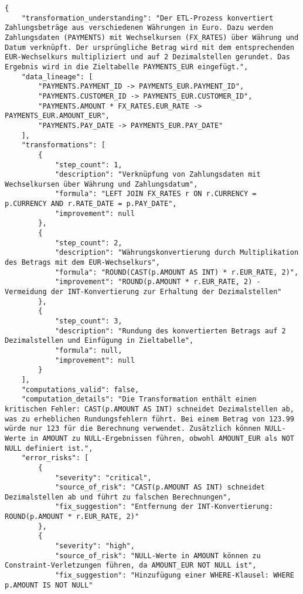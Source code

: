 \begin{lstlisting}[caption={Ausgabe: Claude Sonnet 4 Anwendungsfall 4 Robustheitsdurchlauf},label={claude_case4_prompt3}]
{
    "transformation_understanding": "Der ETL-Prozess konvertiert Zahlungsbeträge aus verschiedenen Währungen in Euro. Dazu werden Zahlungsdaten (PAYMENTS) mit Wechselkursen (FX_RATES) über Währung und Datum verknüpft. Der ursprüngliche Betrag wird mit dem entsprechenden EUR-Wechselkurs multipliziert und auf 2 Dezimalstellen gerundet. Das Ergebnis wird in die Zieltabelle PAYMENTS_EUR eingefügt.",
    "data_lineage": [
        "PAYMENTS.PAYMENT_ID -> PAYMENTS_EUR.PAYMENT_ID",
        "PAYMENTS.CUSTOMER_ID -> PAYMENTS_EUR.CUSTOMER_ID",
        "PAYMENTS.AMOUNT * FX_RATES.EUR_RATE -> PAYMENTS_EUR.AMOUNT_EUR",
        "PAYMENTS.PAY_DATE -> PAYMENTS_EUR.PAY_DATE"
    ],
    "transformations": [
        {
            "step_count": 1,
            "description": "Verknüpfung von Zahlungsdaten mit Wechselkursen über Währung und Zahlungsdatum",
            "formula": "LEFT JOIN FX_RATES r ON r.CURRENCY = p.CURRENCY AND r.RATE_DATE = p.PAY_DATE",
            "improvement": null
        },
        {
            "step_count": 2,
            "description": "Währungskonvertierung durch Multiplikation des Betrags mit dem EUR-Wechselkurs",
            "formula": "ROUND(CAST(p.AMOUNT AS INT) * r.EUR_RATE, 2)",
            "improvement": "ROUND(p.AMOUNT * r.EUR_RATE, 2) - Vermeidung der INT-Konvertierung zur Erhaltung der Dezimalstellen"
        },
        {
            "step_count": 3,
            "description": "Rundung des konvertierten Betrags auf 2 Dezimalstellen und Einfügung in Zieltabelle",
            "formula": null,
            "improvement": null
        }
    ],
    "computations_valid": false,
    "computation_details": "Die Transformation enthält einen kritischen Fehler: CAST(p.AMOUNT AS INT) schneidet Dezimalstellen ab, was zu erheblichen Rundungsfehlern führt. Bei einem Betrag von 123.99 würde nur 123 für die Berechnung verwendet. Zusätzlich können NULL-Werte in AMOUNT zu NULL-Ergebnissen führen, obwohl AMOUNT_EUR als NOT NULL definiert ist.",
    "error_risks": [
        {
            "severity": "critical",
            "source_of_risk": "CAST(p.AMOUNT AS INT) schneidet Dezimalstellen ab und führt zu falschen Berechnungen",
            "fix_suggestion": "Entfernung der INT-Konvertierung: ROUND(p.AMOUNT * r.EUR_RATE, 2)"
        },
        {
            "severity": "high",
            "source_of_risk": "NULL-Werte in AMOUNT können zu Constraint-Verletzungen führen, da AMOUNT_EUR NOT NULL ist",
            "fix_suggestion": "Hinzufügung einer WHERE-Klausel: WHERE p.AMOUNT IS NOT NULL"

\end{lstlisting}
